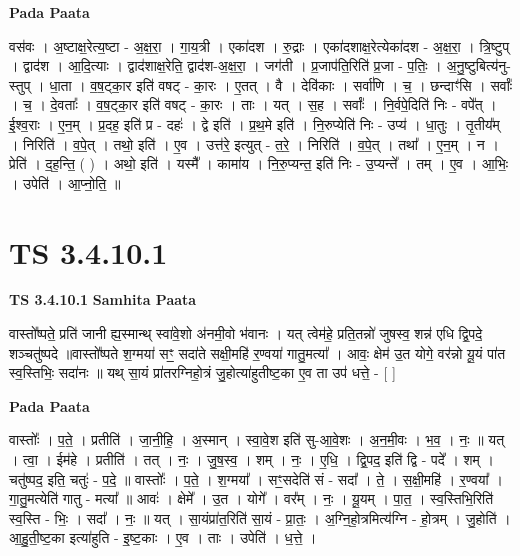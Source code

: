 \documentclass[17pt]{extarticle}
\begin{document}
\textbf{Pada Paata} \newline

वस॑वः । अ॒ष्टाक्ष॒रेत्य॒ष्टा - अ॒क्ष॒रा॒ । गा॒य॒त्री । एका॑दश । रु॒द्राः । एका॑दशाक्ष॒रेत्येका॑दश - अ॒क्ष॒रा॒ । त्रि॒ष्टुप् । द्वाद॑श । आ॒दि॒त्याः । द्वाद॑शाक्ष॒रेति॒ द्वाद॑श-अ॒क्ष॒रा॒ । जग॑ती । प्र॒जाप॑ति॒रिति॑ प्र॒जा - प॒तिः॒ । अ॒नु॒ष्टुबित्य॑नु-स्तुप् । धा॒ता । व॒ष॒ट्का॒र इति॑ वषट् - का॒रः । ए॒तत् । वै । देवि॑काः । सर्वा॑णि । च॒ । छन्दाꣳ॑सि । सर्वाः᳚ । च॒ । दे॒वताः᳚ । व॒ष॒ट्का॒र इति॑ वषट् - का॒रः । ताः । यत् । स॒ह । सर्वाः᳚ । नि॒र्वपे॒दिति॑ निः - वपे᳚त् । ई॒श्व॒राः । ए॒न॒म् । प्र॒दह॒ इति॑ प्र - दहः॑ । द्वे इति॑ । प्र॒थ॒मे इति॑ । नि॒रुप्येति॑ निः - उप्य॑ । धा॒तुः । तृ॒तीय᳚म् । निरिति॑ । व॒पे॒त् । तथो॒ इति॑ । ए॒व । उत्त॑रे॒ इत्युत् - त॒रे॒ । निरिति॑ । व॒पे॒त् । तथा᳚ । ए॒न॒म् । न । प्रेति॑ । द॒ह॒न्ति॒ ( ) । अथो॒ इति॑ । यस्मै᳚ । कामा॑य । नि॒रु॒प्यन्त॒ इति॑ निः - उ॒प्यन्ते᳚ । तम् । ए॒व । आ॒भिः॒ । उपेति॑ । आ॒प्नो॒ति॒ ॥  \newline





\section{ TS 3.4.10.1 }

\textbf{TS 3.4.10.1 } \newline
\textbf{Samhita Paata} \newline

वास्तो᳚ष्पते॒ प्रति॑ जानी ह्य॒स्मान्थ् स्वा॑वे॒शो अ॑नमी॒वो भ॑वानः । यत् त्वेम॑हे॒ प्रति॒तन्नो॑ जुषस्व॒ शन्न॑ एधि द्वि॒पदे॒ शञ्चतु॑ष्पदे ॥वास्तो᳚ष्पते श॒ग्मया॑ सꣳ॒॒ सदा॑ते सक्षी॒महि॑ र॒ण्वया॑ गातु॒मत्या᳚ । आवः॒ क्षेम॑ उ॒त योगे॒ वर॑न्नो यू॒यं पा॑त स्व॒स्तिभिः॒ सदा॑नः ॥ यथ् सा॒यं प्रा॑तरग्निहो॒त्रं जु॒होत्या॑हुतीष्ट॒का ए॒व ता उप॑ धत्ते॒ - [  ] \newline

\textbf{Pada Paata} \newline

वास्तोः᳚ । प॒ते॒ । प्रतीति॑ । जा॒नी॒हि॒ । अ॒स्मान् । स्वा॒वे॒श इति॑ सु-आ॒वे॒शः । अ॒न॒मी॒वः । भ॒व॒ । नः॒ ॥ यत् । त्वा॒ । ईम॑हे । प्रतीति॑ । तत् । नः॒ । जु॒ष॒स्व॒ । शम् । नः॒ । ए॒धि॒ । द्वि॒पद॒ इति॑ द्वि - पदे᳚ । शम् । चतु॑ष्पद॒ इति॒ चतुः॑ - प॒दे॒ ॥ वास्तोः᳚ । प॒ते॒ । श॒ग्मया᳚ । सꣳ॒॒सदेति॑ सं - सदा᳚ । ते॒ । स॒क्षी॒महि॑ । र॒ण्वया᳚ । गा॒तु॒मत्येति॑ गातु - मत्या᳚ ॥ आवः॑ । क्षेमे᳚ । उ॒त । योगे᳚ । वर᳚म् । नः॒ । यू॒यम् । पा॒त॒ । स्व॒स्तिभि॒रिति॑ स्व॒स्ति - भिः॒ । सदा᳚ । नः॒ ॥ यत् । सा॒यंप्रा॑त॒रिति॑ सा॒यं - प्रा॒तः॒ । अ॒ग्नि॒हो॒त्रमित्य॑ग्नि - हो॒त्रम् । जु॒होति॑ । आ॒हु॒ती॒ष्ट॒का इत्या॑हुति - इ॒ष्ट॒काः । ए॒व । ताः । उपेति॑ । ध॒त्ते॒ ।  \newline
\end{document}
